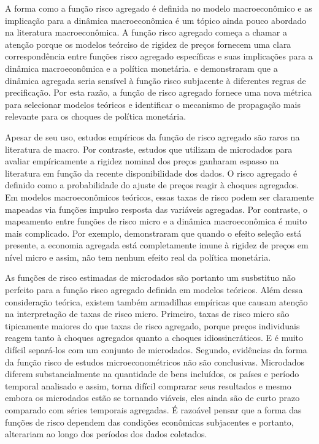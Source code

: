 \documentclass[twoside,a4paper,11pt]{report}
\begin{document}
A forma como a função risco agregado é definida no modelo macroeconômico e as implicação para a dinâmica macroeconômica é um tópico ainda pouco abordado na literatura macroeconômica. A função risco agregado começa a chamar a atenção porque os modelos teórciso de rigidez de preços fornecem uma clara correspondência entre funções risco agregado específicas e suas implicações para a dinâmica macroeconômica e a política monetária. \citet{wolman1999} e \citet{kiley2002partial} demonstraram que a dinâmica agregada seria sensível à função risco subjacente à diferentes regras de precificação. Por esta razão, a função de risco agregado fornece uma nova métrica para selecionar modelos teóricos e identificar o mecanismo de propagação mais relevante para os choques de política monetária. 

Apesar de seu uso, estudos empíricos da função de risco agregado são raros na literatura de macro. Por contraste,
estudos que utilizam de microdados para avaliar empíricamente a rigidez nominal dos preços ganharam espasso na literatura em função da recente disponibilidade dos dados. O risco agregado é definido como a probabilidade do ajuste de preços reagir à choques agregados. Em modelos macroeconômicos teóricos, essas taxas de risco podem ser claramente mapeadas via funções impulso resposta das variáveis agregadas. Por contraste, o mapeamento entre funções de risco micro e a dinâmica macroeconômica é muito mais complicado. Por exemplo, \citet{caplin1987menu} demonstraram que quando o efeito seleção está presente, a economia agregada está completamente imune à rigidez de preços em nível micro e assim, não tem nenhum efeito real da política monetária. 

As funções de risco estimadas de microdados são portanto um susbstituo não perfeito para a função risco agregado definida em modelos teóricos. Além dessa consideração teórica, existem também armadilhas empíricas que causam atenção na interpretação de taxas de risco micro. Primeiro, taxas de risco micro são tipicamente maiores do que taxas de risco agregado, porque preços individuais reagem tanto à choques agregados quanto a choques idiossincráticos. E é muito difícil separá-los com um conjunto de microdados. Segundo, evidências da forma da função risco de estudos microeconométricos não são conclusivas. Microdados diferem substancialmente na quantidade de bens incluídos, os países e período temporal analisado e assim, torna difícil comprarar seus resultados e mesmo embora os microdados estão se tornando viáveis, eles ainda são de curto prazo comparado com séries temporais agregadas. É razoável pensar que a forma das funções de risco dependem das condições econômicas subjacentes e portanto, alterariam ao longo dos períodos dos dados coletados. 
\end{document}
